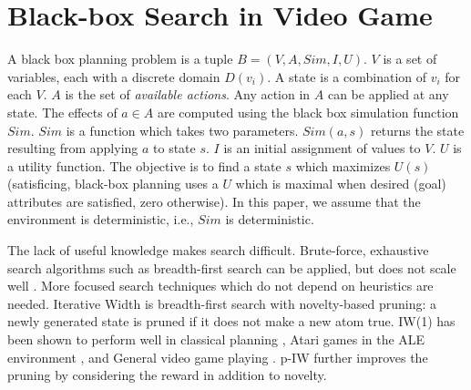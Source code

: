 \documentclass{book}
\begin{document}
\section{Black-box Search in Video Game}
A black box planning problem is a tuple $B=  (V, A, Sim, I, U)$.
$V$ is a set of variables, each with a discrete domain $D(v_i)$. A state is a combination of $v_i$ for each $V$.
$A$ is the set of \emph{available actions}. Any action in $A$ can be applied at any state. The effects of $a \in A$ are computed using the black box simulation function $Sim$.
$Sim$ is a function which takes two parameters. $Sim(a,s)$ returns the state resulting from applying $a$ to state $s$.
$I$ is an initial assignment of values to $V$.
$U$ is a utility function.
The objective is to find a state $s$ which maximizes $U(s)$ (satisficing, black-box planning uses a $U$  which is maximal when desired (goal) attributes are satisfied, zero otherwise).
In this paper, we assume that the environment is deterministic, i.e., $Sim$ is deterministic.

The lack of useful knowledge  makes search difficult.
Brute-force, exhaustive search algorithms such as breadth-first search %
can be applied, but does not scale well \cite{Bellemare2013}. 
More focused search techniques which do not depend on heuristics are needed. %
Iterative Width \cite{Lipovetzky2015a} is breadth-first search with novelty-based pruning: a newly generated state is pruned if it does not make a new atom true. IW(1) has been shown to perform well in classical planning \cite{LipovetzkyG12}, Atari games in the ALE environment \cite{Lipovetzky2015a}, and General video game playing \cite{Geffner2015}.
p-IW \cite{ShleyfmanTD16} further improves the pruning by considering the reward in addition to novelty.

\begin{comment}
\section{Multiple Sequence Alignment}
工事中

\section{Model Checking}
工事中

\end{comment}
\end{document}
